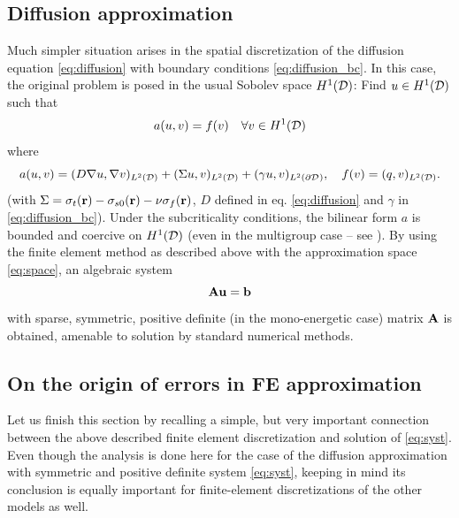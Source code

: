 \subsection{Diffusion approximation}\label{sec:diffusion_weak}

Much simpler situation arises in the spatial discretization of the diffusion equation \eqref{eq:diffusion} with boundary
conditions \eqref{eq:diffusion_bc}. In this case, the original problem is posed in the usual Sobolev space $H^1(\VV)$: 
Find $u\in H^1(\VV)$ such that
\begin{equation}\label{eq:dif_bil_ex}
	a(u,v) = f(v)	\quad	\forall v\in H^1(\VV)
\end{equation}
where 
$$ 
	a(u,v) = (D\nabla u, \nabla v)_{\Lp[2](\VV)} + (\Sigma u, v)_{\Lp[2](\VV)} + (\gamma u, v)_{\Lp[2](\pV)},\quad
	f(v) = (q,v)_{\Lp[2](\VV)}.
$$
(with $\Sigma = \sigma_t(\br) - \sigma_{s0}(\br)  - \nu\sigma_f(\br)$, $D$ defined in eq. \eqref{eq:diffusion} and
$\gamma$ in \eqref{eq:diffusion_bc}).
Under the subcriticality conditions, the bilinear form $a$ is bounded and coercive on $H^1(\VV)$ (even in the multigroup
case -- see \cite[Chap. VII]{DautrayLions2}). By using the finite element method as described
above with the approximation space \eqref{eq:space}, an algebraic system
\begin{equation}\label{eq:syst}
	\mat{A}\mat{u} = \mat{b}
\end{equation}
with sparse, symmetric, positive definite (in the mono-energetic case) matrix $\mat{A}$ is obtained, amenable to
solution by standard numerical methods.


\subsection{On the origin of errors in FE approximation}
Let us finish this section by recalling a simple, but very important connection between the above described finite
element discretization and solution of \eqref{eq:syst}. Even though the
analysis is done here for the case of the diffusion approximation with symmetric and positive definite system
\eqref{eq:syst}, keeping in mind its conclusion is equally important for finite-element discretizations of the other
models as well.

